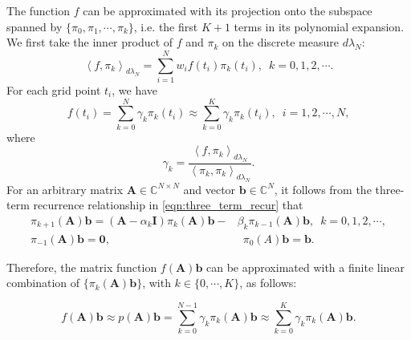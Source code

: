 \documentclass[11pt,letter]{article}
\begin{document}
The function $f$ can be approximated with its projection onto the subspace spanned by $\{\pi_0,\pi_1,\cdots,\pi_k\}$, i.e. the first $K+1$ terms in its polynomial expansion. We first take the inner product of $f$ and $\pi_k$ on the discrete measure $d\lambda_N$:
\begin{equation}
\label{eqn:inner_product}
\left<f,\pi_k\right>_{d\lambda_N}=\sum_{i=1}^N w_if(t_i)\pi_k(t_i),\,\,\,k=0,1,2,\cdots.
\end{equation}
For each grid point $t_i$, we have
\begin{equation}
\label{eqn:expansion_gti}
f(t_i)=\sum_{k=0}^{N} \gamma_k\pi_k(t_i)\approx \sum_{k=0}^K \gamma_k\pi_k(t_i),\,\,\,i=1,2,\cdots,N,
\end{equation}
where $$\gamma_k=\frac{\left<f,\pi_k\right>_{d\lambda_N}}{\left<\pi_k,\pi_k\right>_{d\lambda_N}}.$$
\noindent For an arbitrary matrix $\mathbf{A}\in\mathbb{C}^{N\times N}$ and vector $\mathbf{b}\in\mathbb{C}^N$, it follows from the three-term recurrence relationship in \eqref{eqn:three_term_recur} that
\begin{equation}
\label{eqn:three_term_recur_piab}
\begin{split}
\pi_{k+1}(\mathbf{A})\mathbf{b}=(\mathbf{A}-\alpha_k \mathbf{I})\pi_k(\mathbf{A})\mathbf{b}-&\beta_k \pi_{k-1}(\mathbf{A})\mathbf{b},\,\,\, k=0,1,2,\cdots,\\
\pi_{-1}(\mathbf{A})\mathbf{b}=\bm{0},&\,\,\,\pi_{0}(A)\mathbf{b}=\mathbf{b}.
\end{split}
\end{equation}

\noindent Therefore, the matrix function $f(\mathbf{A})\mathbf{b}$ can be approximated with a finite linear combination of $\{\pi_k(\mathbf{A})\mathbf{b}\}$, with $k\in\{0,\cdots,K\}$, as follows:

\begin{equation}
\label{eqn:expansion_fab}
f(\mathbf{A})\mathbf{b}\approx p(\mathbf{A})\mathbf{b}=\sum_{k=0}^{N-1} \gamma_k\pi_k(\mathbf{A})\mathbf{b}\approx \sum_{k=0}^K \gamma_k\pi_k(\mathbf{A})\mathbf{b}.
\end{equation}
\end{document}
